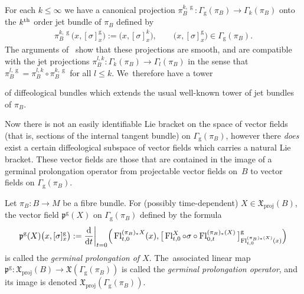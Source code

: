 \documentclass[10pt,a4paper]{amsart}
\numberwithin{equation}{section}
\def\g{\operatorname{g}}
\def\proj{\operatorname{proj}}
\def\Fl{\operatorname{Fl}}
\def\XF{{\mathfrak{X}}}
\def\pf{{\mathfrak{p}}}
\begin{document}
For each $k\leq\infty$ we have a canonical projection $\pi_{B}^{k,\g}\colon \Gamma_{\g}(\pi_{B})\rightarrow \Gamma_{k}(\pi_{B})$ onto the $k^{\rm th}$ order jet bundle of $\pi_{B}$ defined by
\begin{gather*}
\pi_{B}^{k,\g}\big(x,[\sigma]^{\g}_{x}\big):=\big(x,[\sigma]^{k}_{x}\big),\qquad \big(x,[\sigma]^{\g}_{x}\big)\in\Gamma_{\g}(\pi_{B}).
\end{gather*}
The arguments of~\cite[Proposition~5.14]{mac3} show that these projections are smooth, and are compatible with the jet projections $\pi_{B}^{l,k}\colon \Gamma_{k}(\pi_{B})\rightarrow \Gamma_{l}(\pi_{B})$ in the sense that $\pi_{B}^{l,\g} = \pi_{B}^{l,k}\circ\pi_{B}^{k,\g}$ for all $l\leq k$. We~therefore have a tower
\begin{center}
\end{center}
of diffeological bundles which extends the usual well-known tower of jet bundles of $\pi_{B}$.

Now there is not an easily identifiable Lie bracket on the space of vector fields (that is, sections of the internal tangent bundle) on $\Gamma_{\g}(\pi_{B})$, however there \textit{does} exist a certain diffeological subspace of vector fields which carries a natural Lie bracket. These vector fields are those that are contained in the image of a germinal prolongation operator from projectable vector fields on~$B$ to vector fields on $\Gamma_{\g}(\pi_{B})$.

\begin{Definition}
Let $\pi_{B}\colon B\rightarrow M$ be a fibre bundle. For (possibly time-dependent) $X\in\XF_{\proj}(B)$, the vector field $\pf^{\g}(X)$ on $\Gamma_{\g}(\pi_{B})$ defined by the formula
\begin{gather*}
\pf^{\g}(X)\big(x,[\sigma]^{\g}_{x}\big):=\frac{\rm d}{{\rm d}t}\bigg|_{t=0} \Big(\Fl^{(\pi_{B})_{*}X}_{t,0}(x),\big[\Fl^{X}_{t,0}\circ\sigma \circ\Fl^{(\pi_{B})_{*}(X)}_{0,t}\big]^{\g}_{\Fl^{(\pi_{B})_{*}(X)}_{t,0}(x)}\Big)
\end{gather*}
is called the \textit{germinal prolongation of $X$}. The~associated linear map $\pf^{\g}\colon \XF_{\proj}(B)\rightarrow \XF(\Gamma_{\g}(\pi_{B}))$ is called the \textit{germinal prolongation operator}, and its image is denoted $\XF_{\proj}(\Gamma_{\g}(\pi_{B}))$.
\end{Definition}
\end{document}
